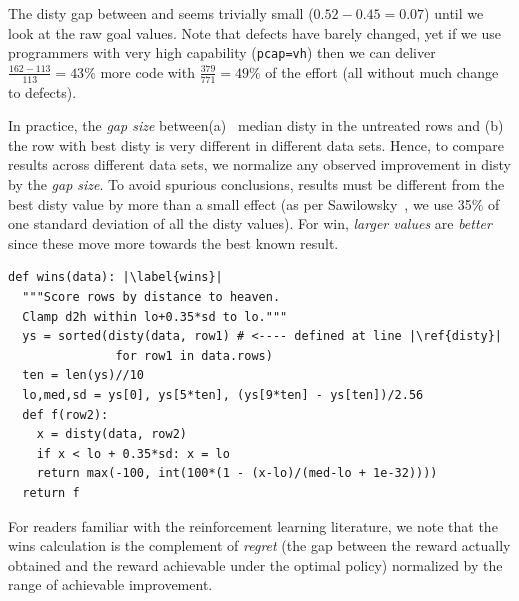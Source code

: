 \documentclass[AMA,STIX2COL]{WileyNJDv5}
\newcommand{\disc}[2][black]{%
    \tikz[baseline=(c.base)]%
      \node[circle, fill=#1, draw=#1,
            inner sep=0pt, minimum size=1.2ex,
            text=white, font=\tiny\bfseries]
      (c) {#2};%
  }
\newcommand{\rc}[1]{%
  \iftoggle{rcred}{\disc[red]{#1}}{\disc[black]{#1}}%
}
\begin{document}

The  \textsf{disty}  gap between \rc{1} and \rc{2} seems trivially small \mbox{($0.52 - 0.45 = 0.07$)}  until we look at
the raw goal values. Note that defects have barely changed, yet if we use
programmers with very high capability (\texttt{pcap=vh}) then we can deliver
$\frac{162-113}{113} = 43\%$ more code with $\frac{379}{771} = 49\%$ of the
effort (all without much change to defects).

In practice, the {\em gap size} between(a)~ median  \textsf{disty} in the untreated rows and (b)~ the   row with best \textsf{disty} 
  is very different in different data sets. Hence, to compare
results across different data sets, we normalize  any observed improvement
in  \textsf{disty}  by the {\em gap size}.  
To avoid spurious conclusions, results
must    be different from the best \textsf{disty} value by more than a small effect (as per Sawilowsky~\cite{sawilowsky2009new}, we use 35\% of one standard deviation of all the \textsf{disty} values). For \textsf{win}, {\em larger values} are {\em better}
since these move more towards the best known result. 
\begin{verbatim}
def wins(data): |\label{wins}|
  """Score rows by distance to heaven.
  Clamp d2h within lo+0.35*sd to lo."""
  ys = sorted(disty(data, row1) # <---- defined at line |\ref{disty}|
               for row1 in data.rows)
  ten = len(ys)//10
  lo,med,sd = ys[0], ys[5*ten], (ys[9*ten] - ys[ten])/2.56
  def f(row2):
    x = disty(data, row2)
    if x < lo + 0.35*sd: x = lo
    return max(-100, int(100*(1 - (x-lo)/(med-lo + 1e-32))))
  return f
\end{verbatim}
For readers familiar with the reinforcement learning literature, we note that
the \textsf{wins} calculation  is the complement of {\em regret} (the gap between
the reward actually obtained and the reward achievable under the optimal
policy) normalized by the range of achievable improvement.
\end{document}

